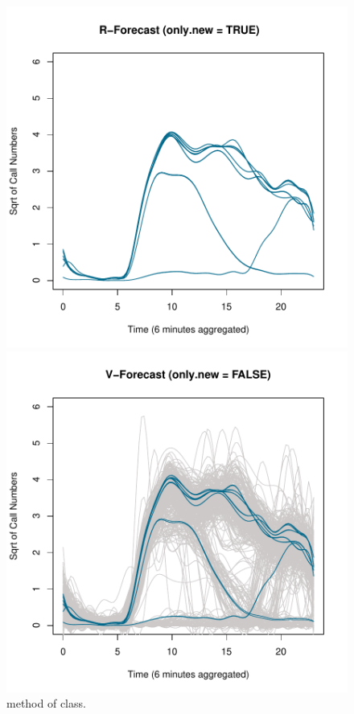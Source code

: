 \begin{figure}[h!]
	\centering
	\begin{minipage}{0.4\textwidth}
		\centering
		\includegraphics[width=\textwidth]{figures/Rfore.pdf}
	\end{minipage}%
	\begin{minipage}{0.4\textwidth}
		\centering
		\includegraphics[width=\textwidth]{figures/Vfore.pdf}
	\end{minipage}
	\caption{ method of  class.}
	\label{fig:forecast}
\end{figure}
